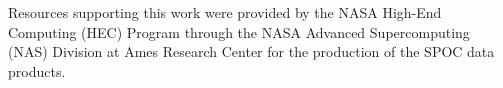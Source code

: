 \documentclass[12pt,twocolumn,tighten]{aastex63}
\begin{document}
Resources supporting this work were provided by the NASA High-End
Computing (HEC) Program through the NASA Advanced Supercomputing (NAS)
Division at Ames Research Center for the production of the SPOC data
products.

%
%
%
%
%
%
\end{document}
